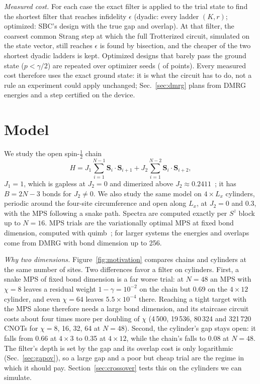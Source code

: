 \documentclass[aps,pra,twocolumn,superscriptaddress,nofootinbib]{revtex4-2}
\begin{document}
\emph{Measured cost.} For each case the exact filter is applied to the trial state to find the shortest filter that
reaches infidelity $\epsilon$ (dyadic: every ladder $(K,r)$; optimized: SBC's design with the true gap and overlap).
At that filter, the coarsest common Strang step at which the full Trotterized circuit, simulated on the state vector,
still reaches $\epsilon$ is found by bisection, and the cheaper of the two shortest dyadic ladders is kept. Optimized
designs that barely pass the ground state ($p<\gamma/2$) are repeated over optimizer seeds (\optRetried{} of
\optPoints{} points). Every measured cost therefore uses the exact ground state: it is what the circuit has to do, not
a rule an experiment could apply unchanged; Sec.~\ref{sec:dmrg} plans from DMRG energies and a step certified on the device.

\section{Model}
\label{sec:application}

We study the open spin-$\frac12$ chain
\begin{equation}
H=J_1\sum_{i=1}^{N-1}\mathbf S_i\cdot\mathbf S_{i+1}+J_2\sum_{i=1}^{N-2}\mathbf S_i\cdot\mathbf S_{i+2},
\end{equation}
$J_1=1$, which is gapless at $J_2=0$ and dimerized above $J_2\approx0.2411$~\cite{Okamoto1992,Eggert1996}; it has
$B=2N-3$ bonds for $J_2\ne0$. We also study the same model on $4\times L_x$ cylinders, periodic around the four-site
circumference and open along $L_x$, at $J_2=0$ and 0.3, with the MPS following a snake path. Spectra are computed
exactly per $S^z$ block up to $N=16$. MPS trials are the variationally optimal MPS at fixed bond dimension, computed
with quimb~\cite{Gray2018}; for larger systems the energies and overlaps come from DMRG with bond dimension up to 256.

\emph{Why two dimensions.} Figure~\ref{fig:motivation} compares chains and cylinders at the same number of sites. Two
differences favor a filter on cylinders. First, a snake MPS of fixed bond dimension is a far worse trial: at $N=48$ an
MPS with $\chi=8$ leaves a residual weight $1-\gamma=10^{-2}$ on the chain but 0.69 on the $4\times12$ cylinder, and
even $\chi=64$ leaves $5.5\times10^{-4}$ there. Reaching a tight target with the MPS alone therefore needs a large bond
dimension, and its staircase circuit costs about four times more per doubling of $\chi$ (4\,500, 19\,536, 80\,324 and
321\,720 CNOTs for $\chi=8$, 16, 32, 64 at $N=48$). Second, the cylinder's gap stays open: it falls from 0.66 at
$4\times3$ to 0.35 at $4\times12$, while the chain's falls to 0.08 at $N=48$. The filter's depth is set by the gap and
its overlap cost is only logarithmic (Sec.~\ref{sec:gapov}), so a large gap and a poor but cheap trial are the regime in
which it should pay. Section~\ref{sec:crossover} tests this on the cylinders we can simulate.
\end{document}

